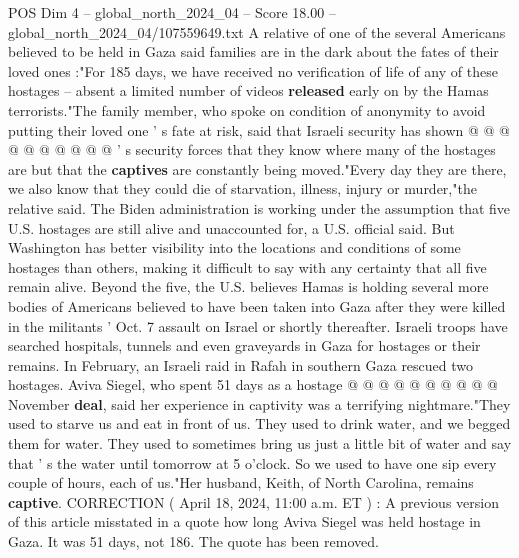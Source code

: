\begin{textsample}{POS Dim 4 – global\_north\_2024\_04 – Score 18.00 – global\_north\_2024\_04/107559649.txt}
A relative of one of the several Americans believed to be held in Gaza said families are in the dark about the fates of their loved ones :"For 185 days, we have received no verification of life of any of these hostages -- absent a limited number of videos \textbf{released} early on by the Hamas terrorists."The family member, who spoke on condition of anonymity to avoid putting their loved one ' s fate at risk, said that Israeli security has shown @ @ @ @ @ @ @ @ @ @ ' s security forces that they know where many of the hostages are but that the \textbf{captives} are constantly being moved."Every day they are there, we also know that they could die of starvation, illness, injury or murder,"the relative said.
The Biden administration is working under the assumption that five U.S. hostages are still alive and unaccounted for, a U.S. official said.
But Washington has better visibility into the locations and conditions of some hostages than others, making it difficult to say with any certainty that all five remain alive.
Beyond the five, the U.S. believes Hamas is holding several more bodies of Americans believed to have been taken into Gaza after they were killed in the militants ' Oct. 7 assault on Israel or shortly thereafter.
Israeli troops have searched hospitals, tunnels and even graveyards in Gaza for hostages or their remains.
In February, an Israeli raid in Rafah in southern Gaza rescued two hostages.
Aviva Siegel, who spent 51 days as a hostage @ @ @ @ @ @ @ @ @ @ November \textbf{deal}, said her experience in captivity was a terrifying nightmare."They used to starve us and eat in front of us.
They used to drink water, and we begged them for water.
They used to sometimes bring us just a little bit of water and say that ' s the water until tomorrow at 5 o'clock.
So we used to have one sip every couple of hours, each of us."Her husband, Keith, of North Carolina, remains \textbf{captive}.
CORRECTION ( April 18, 2024, 11:00 a.m.
ET ) : A previous version of this article misstated in a quote how long Aviva Siegel was held hostage in Gaza.
It was 51 days, not 186.
The quote has been removed.

\end{textsample}
